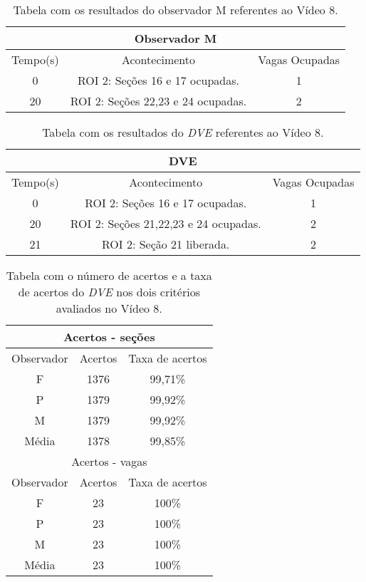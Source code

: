 \begin{table}[H]
\begin{center}
\begin{tabular}{|c||c||c|}
\hline
\multicolumn{3}{|c|}{Observador M}  \\ \hline \hline
Tempo(s) & Acontecimento & Vagas Ocupadas\\ \hline
0 & ROI 2: Seções 16 e 17 ocupadas. & 1 \\ \hline
20 & ROI 2: Seções 22,23 e 24 ocupadas. & 2 \\
\hline
\end{tabular}
\end{center}
\caption{Tabela com os resultados do observador M referentes ao Vídeo 8.}
\label{tab:video8M}
\end{table}


\begin{table}[H]
\begin{center}
\begin{tabular}{|c||c||c|}
\hline
\multicolumn{3}{|c|}{DVE}  \\ \hline \hline
Tempo(s) & Acontecimento & Vagas Ocupadas\\ \hline
0 & ROI 2: Seções 16 e 17 ocupadas. & 1 \\ \hline
20 & ROI 2: Seções 21,22,23 e 24 ocupadas. & 2 \\ \hline
21 & ROI 2: Seção 21 liberada. & 2 \\
\hline
\end{tabular}
\end{center}
\caption{Tabela com os resultados do \textit{DVE} referentes ao Vídeo 8.}
\label{tab:video8}
\end{table}

\begin{table}[H]
\begin{center}
\begin{tabular}{|c||c||c|}
\hline
\multicolumn{3}{|c|}{Acertos - seções}  \\ \hline\hline
Observador & Acertos & Taxa de acertos \\ \hline
F & 1376 & 99,71\% \\  \hline
P & 1379 & 99,92\% \\ \hline
M & 1379 & 99,92\% \\ \hline
Média & 1378 & 99,85\% \\
\hline
\hline
\multicolumn{3}{|c|}{Acertos - vagas}  \\ \hline \hline
Observador & Acertos & Taxa de acertos \\ \hline
F & 23 & 100\% \\  \hline
P & 23 & 100\% \\ \hline
M & 23 & 100\% \\ \hline
Média & 23 & 100\% \\
\hline
\end{tabular}
\end{center}
\caption{Tabela com o número de acertos e a taxa de acertos do \textit{DVE} nos dois 
critérios avaliados no Vídeo 8.}
\label{tab:rvideo8}
\end{table}

